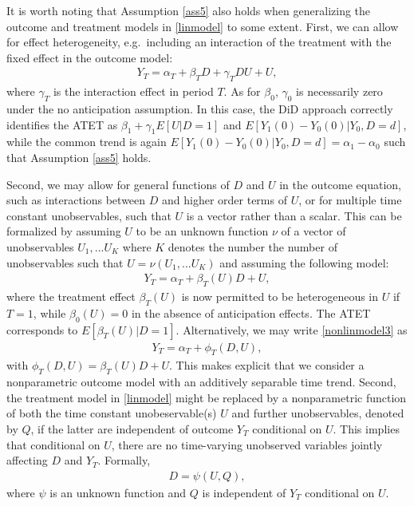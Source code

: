 {	It is worth noting that Assumption \ref{ass5} also holds when generalizing the outcome and treatment models in \eqref{linmodel} to some extent. First, we can allow for effect heterogeneity, e.g.\ including an interaction of the treatment with the fixed effect in the outcome model:
	\begin{eqnarray}\label{linmodel2}
		Y_T= \alpha_T + \beta_T D + \gamma_T D U + U,
	\end{eqnarray}
	where $\gamma_T$ is the interaction effect in period $T$. As for $\beta_0$, $\gamma_0$ is necessarily zero under the no anticipation assumption. In this case, the DiD approach correctly identifies the ATET as $\beta_1+\gamma_1 E[U|D=1]$ and $E[Y_1(0)-Y_0(0)|Y_0,D=d]$, while the common trend is again $E[Y_1(0)-Y_0(0)|Y_0,D=d]=\alpha_1-\alpha_0$ such that Assumption \ref{ass5} holds.
	
	Second, we may allow for general functions of $D$ and $U$ in the outcome equation, such as interactions between $D$ and higher order terms of $U$, or for multiple time constant unobservables, such that $U$ is a vector rather than a scalar. This can be formalized by assuming $U$ to be an unknown function $\nu$ of a vector of unobservables $U_1,...U_K$ where $K$ denotes the number the number of unobservables such that $U=\nu(U_1,...U_K)$ and assuming the following model:
	\begin{eqnarray}\label{nonlinmodel3}
		Y_T= \alpha_T + \beta_T(U) D + U,
	\end{eqnarray}
	where the treatment effect $\beta_T(U)$ is now permitted to be heterogeneous in $U$ if $T=1$, while $\beta_0(U)=0$ in the absence of anticipation effects. The ATET corresponds to $E[\beta_T(U)|D=1]$. Alternatively, we may write  \eqref{nonlinmodel3} as
	\begin{eqnarray}\label{nonlinmodel4}
		Y_T= \alpha_T + \phi_T(D,U),
	\end{eqnarray}
	with $\phi_T(D,U)=\beta_T(U) D + U$. This makes explicit that we consider a nonparametric outcome model with an additively separable time trend. Second, the treatment model in \eqref{linmodel} might be replaced by a nonparametric function of both the time constant unobeservable(s) $U$ and further unobservables, denoted by $Q$, if the latter are independent of outcome $Y_T$ conditional on $U$. This implies that conditional on $U$, there are no time-varying unobserved variables jointly affecting $D$ and $Y_T$. Formally,
	\begin{eqnarray}\label{nonlintreat}
		D=\psi(U,Q),
	\end{eqnarray}
	where $\psi$ is an unknown function and $Q$ is independent of $Y_T$ conditional on $U$.
	
}
